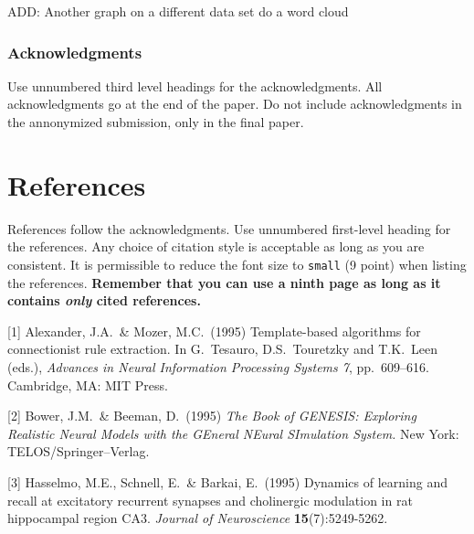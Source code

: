 \documentclass{article}
\begin{document}
ADD: Another graph on a different data set
do a word cloud




\newpage

\subsubsection*{Acknowledgments}

Use unnumbered third level headings for the acknowledgments. All
acknowledgments go at the end of the paper. Do not include
acknowledgments in the annonymized submission, only in the final paper.

\section*{References}

References follow the acknowledgments. Use unnumbered first-level
heading for the references. Any choice of citation style is acceptable
as long as you are consistent. It is permissible to reduce the font
size to \verb+small+ (9 point) when listing the references. {\bf
  Remember that you can use a ninth page as long as it contains
  \emph{only} cited references.}
\medskip

\small

[1] Alexander, J.A.\ \& Mozer, M.C.\ (1995) Template-based algorithms
for connectionist rule extraction. In G.\ Tesauro, D.S.\ Touretzky and
T.K.\ Leen (eds.), {\it Advances in Neural Information Processing
  Systems 7}, pp.\ 609--616. Cambridge, MA: MIT Press.

[2] Bower, J.M.\ \& Beeman, D.\ (1995) {\it The Book of GENESIS:
  Exploring Realistic Neural Models with the GEneral NEural SImulation
  System.}  New York: TELOS/Springer--Verlag.

[3] Hasselmo, M.E., Schnell, E.\ \& Barkai, E.\ (1995) Dynamics of
learning and recall at excitatory recurrent synapses and cholinergic
modulation in rat hippocampal region CA3. {\it Journal of
  Neuroscience} {\bf 15}(7):5249-5262.
\end{document}
